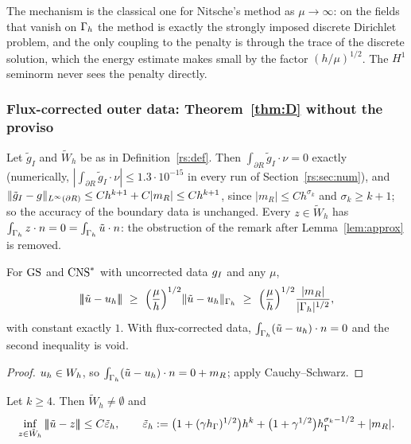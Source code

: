 The mechanism is the classical one for Nitsche's method as $\mu\to\infty$: on the fields that vanish on $\Gamma_h$ the method is exactly the strongly imposed discrete Dirichlet problem, and the only coupling to the penalty is through the trace of the discrete solution, which the energy estimate makes small by the factor $(h/\mu)^{1/2}$. The $H^1$ seminorm never sees the penalty directly.

\subsubsection{Flux-corrected outer data: Theorem~\ref{thm:D} without the proviso}\label{rs:sec:flux}

Let $\tilde g_I$ and $\tilde W_h$ be as in Definition~\ref{rs:def}. Then $\int_{\partial R}\tilde g_I\cdot\nu=0$ exactly (numerically, $|\int_{\partial R}\tilde g_I\cdot\nu|\le1.3\cdot10^{-15}$ in every run of Section~\ref{rs:sec:num}), and $\lVert \tilde g_I-g\rVert_{L^\infty(\partial R)}\le Ch^{k+1}+C|m_R|\le Ch^{k+1}$, since $|m_R|\le Ch^{\sigma_k}$ and $\sigma_k\ge k+1$; so the accuracy of the boundary data is unchanged. Every $z\in\tilde W_h$ has $\int_{\Gamma_h}z\cdot n=0=\int_{\Gamma_h}\tilde u\cdot n$: the obstruction of the remark after Lemma~\ref{lem:approx} is removed.

\begin{proposition}\label{rs:floor}
For $\mathrm{GS}$ and $\mathrm{CNS}^\ast$ with uncorrected data $g_I$ and any $\mu$,
\[
|\!|\!|\tilde u-u_h|\!|\!|\ \ge\ \Bigl(\frac\mu h\Bigr)^{1/2}\lVert \tilde u-u_h\rVert_{\Gamma_h}\ \ge\ \Bigl(\frac\mu h\Bigr)^{1/2}\frac{|m_R|}{|\Gamma_h|^{1/2}},
\]
with constant exactly $1$. With flux-corrected data, $\int_{\Gamma_h}(\tilde u-u_h)\cdot n=0$ and the second inequality is void.
\end{proposition}

\begin{proof}
$u_h\in W_h$, so $\int_{\Gamma_h}(\tilde u-u_h)\cdot n=0+m_R$; apply Cauchy--Schwarz.
\end{proof}

\begin{lemma}\label{rs:approx}
Let $k\ge4$. Then $\tilde W_h\neq\emptyset$ and
\[
\inf_{z\in\tilde W_h}|\!|\!|\tilde u-z|\!|\!|\le C\tilde\varepsilon_h,\qquad
\tilde\varepsilon_h:=\bigl(1+(\gamma h_\Gamma)^{1/2}\bigr)h^k+\bigl(1+\gamma^{1/2}\bigr)h_\Gamma^{\sigma_k-1/2}+|m_R| .
\]
\end{lemma}

